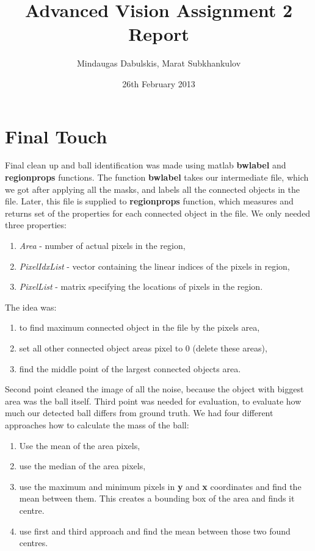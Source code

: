 \documentclass[10pt,a4paper,oneclumn]{article}
\title{Advanced Vision Assignment 2 Report}  %
\author{Mindaugas Dabulskis, Marat Subkhankulov}                      %
\date{26th February 2013}                 %
\begin{document}
\maketitle  %
%

\section{Final Touch}

Final clean up and ball identification was made using matlab \textbf{bwlabel} and \textbf{regionprops} functions. The function \textbf{bwlabel} takes our intermediate file, which we got after applying all the masks, and labels all the connected objects in the file. Later, this file is supplied to \textbf{regionprops} function, which measures and returns set of the properties for each connected object in the file. We only needed three properties:

\begin{enumerate}
\item \emph{Area} - number of actual pixels in the region,
\item \emph{PixelIdxList} - vector containing the linear indices of the pixels in region,
\item \emph{PixelList} - matrix specifying the locations of pixels in the region.
\end{enumerate}

The idea was: 
\begin{enumerate}
\item to find maximum connected object in the file by the pixels area, 
\item set all other connected object areas pixel to 0 (delete these areas), 
\item find the middle point of the largest connected objects area. 
\end{enumerate}

Second point cleaned the image of all the noise, because the object with biggest area was the ball itself. Third point was needed for evaluation, to evaluate how much our detected ball differs from ground truth. We had four different approaches how to calculate the mass of the ball:

\begin{enumerate}
\item Use the mean of the area pixels,
\item use the median of the area pixels,
\item use the maximum and minimum pixels in \textbf{y} and \textbf{x} coordinates and find the mean between them. This creates a bounding box of the area and finds it centre.
\item use first and third approach and find the mean between those two found centres.
\end{enumerate}
\end{document}
